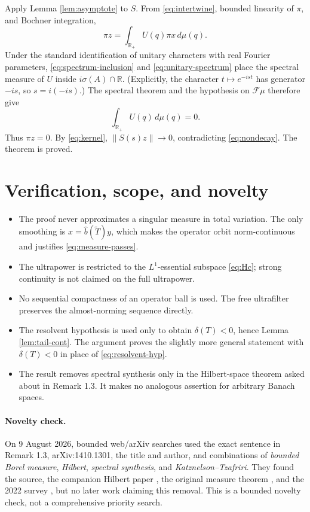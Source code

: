 \documentclass[11pt]{article}
\newcommand{\R}{\mathbb R}
\newcommand{\norm}[1]{\left\lVert#1\right\rVert}
\begin{document}
Apply Lemma \ref{lem:asymptote} to \(S\). From
\eqref{eq:intertwine}, bounded linearity of \(\pi\), and Bochner
integration,
\begin{equation}\label{eq:measure-intertwine}
 \pi z=\int_{\R_+}U(q)\pi x\,d\mu(q).
\end{equation}
Under the standard identification of unitary characters with real Fourier
parameters, \eqref{eq:spectrum-inclusion} and
\eqref{eq:unitary-spectrum} place the spectral measure of \(U\) inside
\(i\sigma(A)\cap\R\). (Explicitly, the character \(t\mapsto e^{-ist}\)
has generator \(-is\), so \(s=i(-is)\).) The spectral theorem and the
hypothesis on \(\mathcal F\mu\) therefore give
\[
 \int_{\R_+}U(q)\,d\mu(q)=0.
\]
Thus \(\pi z=0\). By \eqref{eq:kernel},
\(\norm{S(s)z}\to0\), contradicting \eqref{eq:nondecay}. The theorem is
proved.

\section{Verification, scope, and novelty}

\begin{itemize}[leftmargin=1.5em]
\item The proof never approximates a singular measure in total variation.
  The only smoothing is \(x=\widehat b(\widetilde T)y\), which makes the
  operator orbit norm-continuous and justifies
  \eqref{eq:measure-passes}.
\item The ultrapower is restricted to the \(L^1\)-essential subspace
  \eqref{eq:Hc}; strong continuity is not claimed on the full ultrapower.
\item No sequential compactness of an operator ball is used. The free
  ultrafilter preserves the almost-norming sequence directly.
\item The resolvent hypothesis is used only to obtain
  \(\delta(T)<0\), hence Lemma \ref{lem:tail-cont}. The argument proves the
  slightly more general statement with \(\delta(T)<0\) in place of
  \eqref{eq:resolvent-hyp}.
\item The result removes spectral synthesis only in the Hilbert-space
  theorem asked about in Remark 1.3. It makes no analogous assertion for
  arbitrary Banach spaces.
\end{itemize}

\paragraph{Novelty check.}
On 9 August 2026, bounded web/arXiv searches used the exact sentence in
Remark 1.3, arXiv:1410.1301, the title and author, and combinations of
\emph{bounded Borel measure}, \emph{Hilbert}, \emph{spectral synthesis}, and
\emph{Katznelson--Tzafriri}. They found the source, the companion Hilbert
paper \cite{SeifertHilbert}, the original measure theorem
\cite{BCT}, and the 2022 survey \cite{BattySeifertSurvey}, but no later work
claiming this removal. This is a bounded novelty check, not a comprehensive
priority search.
\end{document}
